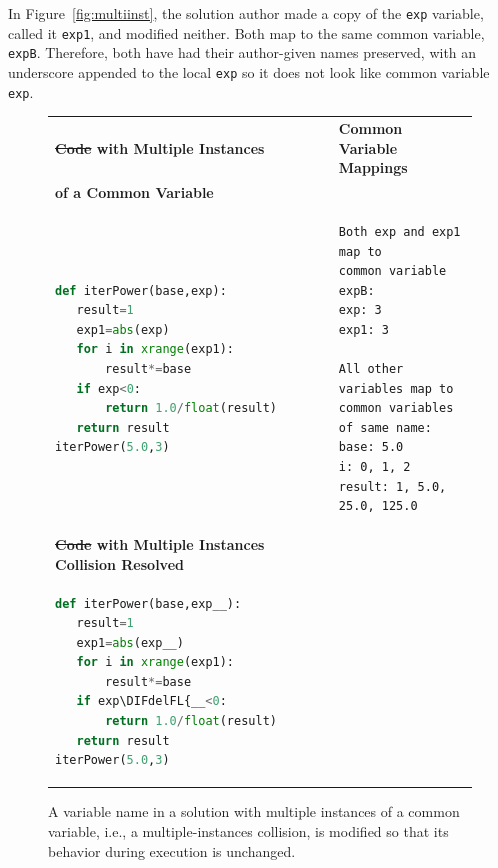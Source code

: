 \documentclass[12pt,twoside]{mitthesis}
\newcommand \codevar[1]{\texttt{#1}}
\providecommand{\DIFaddtex}[1]{{\protect\color{blue}\uwave{#1}}} %
\providecommand{\DIFdeltex}[1]{{\protect\color{red}\sout{#1}}}                      %
\providecommand{\DIFaddFL}[1]{\DIFadd{#1}} %
\providecommand{\DIFdelFL}[1]{\DIFdel{#1}} %
\providecommand{\DIFaddbeginFL}{} %
\providecommand{\DIFaddendFL}{} %
\providecommand{\DIFdelbeginFL}{} %
\providecommand{\DIFdelendFL}{} %
\providecommand{\DIFadd}[1]{\texorpdfstring{\DIFaddtex{#1}}{#1}} %
\providecommand{\DIFdel}[1]{\texorpdfstring{\DIFdeltex{#1}}{}} %
\begin{document}
In Figure~\ref{fig:multiinst}, the solution author made a copy of the \codevar{exp} variable, called it \codevar{exp1}, and modified neither. Both map to the same common variable, \codevar{expB}. Therefore, both have had their author-given names preserved, with an underscore appended to the local \codevar{exp} so it does not look like common variable \codevar{exp}. 
\begin{figure}
\begin{tabular}{ll}
{\bf \DIFdelbeginFL \DIFdelFL{Code }\DIFdelendFL \DIFaddbeginFL \DIFaddFL{Solution }\DIFaddendFL with Multiple Instances} & {\bf Common Variable Mappings} \\
{\bf of a Common Variable} & \\
\begin{minipage}{0.4\linewidth}
\begin{lstlisting}[basicstyle=\linespread{1.0}\ttfamily\footnotesize,language=python]
def iterPower(base,exp):
   result=1
   exp1=abs(exp)
   for i in xrange(exp1):
       result*=base
   if exp<0:
       return 1.0/float(result)
   return result
iterPower(5.0,3)
\end{lstlisting}
\end{minipage}
&
\begin{minipage}{0.6\linewidth}
\begin{lstlisting}[basicstyle=\linespread{1.0}\ttfamily\footnotesize]
Both exp and exp1 map to
common variable expB:
exp: 3 
exp1: 3 

All other variables map to
common variables of same name:
base: 5.0 
i: 0, 1, 2 
result: 1, 5.0, 25.0, 125.0 
\end{lstlisting}
\end{minipage} \\
{\bf \DIFdelbeginFL \DIFdelFL{Code }\DIFdelendFL \DIFaddbeginFL \DIFaddFL{Solution }\DIFaddendFL with Multiple Instances Collision Resolved} & \\
\begin{minipage}{0.4\linewidth}
\begin{lstlisting}[basicstyle=\linespread{1.0}\ttfamily\footnotesize,language=python,linebackgroundcolor={\lstcolorlines[gray!20]{1,3,6}}]
def iterPower(base,exp__):
   result=1
   exp1=abs(exp__)
   for i in xrange(exp1):
       result*=base
   if exp\DIFdelbeginFL \DIFdelFL{__<0:
       return 1.0/float(result)
   return result
iterPower(5.0,3)
\end{lstlisting}
\end{minipage}
& \\
\end{tabular}
\caption{A variable name in a solution with multiple instances of a common variable, i.e., a multiple-instances collision, is modified so that its behavior during execution is unchanged.}
\end{figure}
\end{document}

